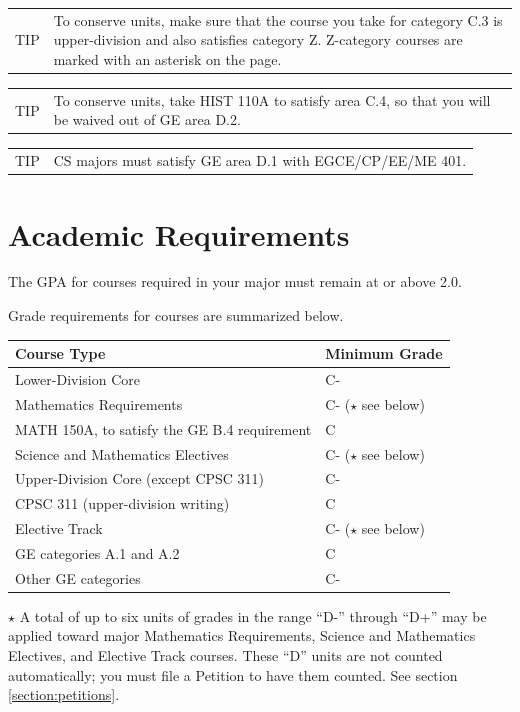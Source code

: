\documentclass{book}
\newenvironment{tip}
               {\tcolorbox \begin{tabular}{m{.5in} m{5in}} \Large{TIP} & }
               {\end{tabular} \endtcolorbox}
\begin{document}
\begin{tip}
To conserve units, make sure that the course you take for category C.3 is upper-division and also satisfies category Z. Z-category courses are marked with an asterisk on the \gecourselist page.
\end{tip}

\begin{tip}
  To conserve units, take HIST 110A to satisfy area C.4, so that you will be waived out of GE area D.2.
  \end{tip}

\begin{tip}
CS majors must satisfy GE area D.1 with EGCE/CP/EE/ME 401.
\end{tip}

\section{Academic Requirements}

The GPA for courses required in your major must remain at or above 2.0.

Grade requirements for courses are summarized below.

\begin{center}
\begin{tabular}{|l|l|} \hline
  \textbf{Course Type} & \textbf{Minimum Grade} \\ \hline
  Lower-Division Core & C- \\ \hline
  Mathematics Requirements & C- ($\star$ see below) \\ \hline
  MATH 150A, to satisfy the GE B.4 requirement & C \\ \hline
  Science and Mathematics Electives & C- ($\star$ see below) \\ \hline
  Upper-Division Core (except CPSC 311) & C- \\ \hline
  CPSC 311 (upper-division writing) & C \\ \hline
  Elective Track & C- ($\star$ see below) \\ \hline
  GE categories A.1 and A.2 & C \\ \hline
  Other GE categories & C- \\ \hline
\end{tabular}
\end{center}

$\star$ A total of up to six units of grades in the range ``D-'' through ``D+'' may be applied toward major Mathematics Requirements, Science and Mathematics Electives, and Elective Track courses. These ``D'' units are not counted automatically; you must file a Petition to have them counted. See section \ref{section:petitions}.
\end{document}
